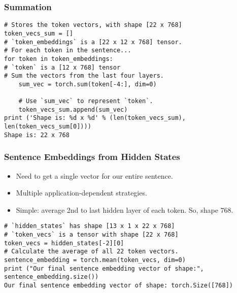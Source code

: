 \begin{frame}[fragile]\frametitle{Summation}


\begin{lstlisting}
# Stores the token vectors, with shape [22 x 768]
token_vecs_sum = []
# `token_embeddings` is a [22 x 12 x 768] tensor.
# For each token in the sentence...
for token in token_embeddings:
# `token` is a [12 x 768] tensor
# Sum the vectors from the last four layers.
    sum_vec = torch.sum(token[-4:], dim=0)
    
    # Use `sum_vec` to represent `token`.
    token_vecs_sum.append(sum_vec)
print ('Shape is: %d x %d' % (len(token_vecs_sum), len(token_vecs_sum[0])))
Shape is: 22 x 768
\end{lstlisting}

\end{frame}

\begin{frame}[fragile]\frametitle{Sentence Embeddings from Hidden States}

\begin{itemize}
\item Need to get a single vector for our entire sentence. 
\item Multiple application-dependent strategies.
\item Simple: average 2nd to last hidden layer of each token. So, shape $768$.
\end{itemize}

\begin{lstlisting}
# `hidden_states` has shape [13 x 1 x 22 x 768]
# `token_vecs` is a tensor with shape [22 x 768]
token_vecs = hidden_states[-2][0]
# Calculate the average of all 22 token vectors.
sentence_embedding = torch.mean(token_vecs, dim=0)
print ("Our final sentence embedding vector of shape:", sentence_embedding.size())
Our final sentence embedding vector of shape: torch.Size([768])
\end{lstlisting}
\end{frame}

